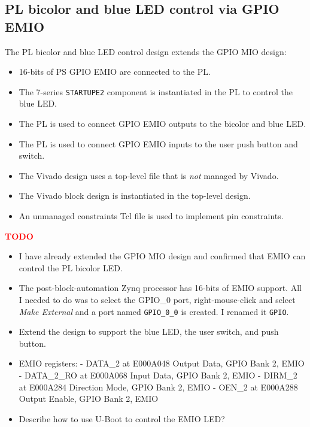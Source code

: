 \subsection{PL bicolor and blue LED control via GPIO EMIO}

The PL bicolor and blue LED control design extends the GPIO MIO design:
%
\begin{itemize}
\item 16-bits of PS GPIO EMIO are connected to the PL.
\item The 7-series \verb+STARTUPE2+ component is instantiated in the PL
to control the blue LED.
\item The PL is used to connect GPIO EMIO outputs to the
bicolor and blue LED.
\item The PL is used to connect GPIO EMIO inputs to the user
push button and switch.
\item The Vivado design uses a top-level file that is \emph{not}
managed by Vivado.
\item The Vivado block design is instantiated in the top-level design.
\item An unmanaged constraints Tcl file is used to implement pin constraints.
\end{itemize}

\noindent\textcolor{red}{\bf TODO}
\begin{itemize}
\item I have already extended the GPIO MIO design and confirmed that EMIO can control the PL bicolor LED.
\item The post-block-automation Zynq processor has 16-bits of EMIO support. All I needed to do was
to select the GPIO\_0 port, right-mouse-click and select \emph{Make External} and a port named
\texttt{GPIO\_0\_0} is created. I renamed it \texttt{GPIO}.
\item Extend the design to support the blue LED, the user switch, and push button.
\item EMIO registers:
 - DATA\_2     at E000A048  Output Data, GPIO Bank 2, EMIO
 - DATA\_2\_RO at E000A068  Input Data, GPIO Bank 2, EMIO
 - DIRM\_2     at E000A284  Direction Mode, GPIO Bank 2, EMIO
 - OEN\_2      at E000A288  Output Enable, GPIO Bank 2, EMIO
\item Describe how to use U-Boot to control the EMIO LED?
\end{itemize}


